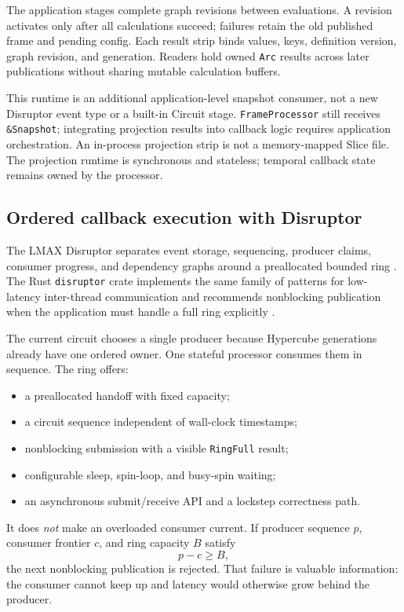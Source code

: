 \documentclass{strategynet-journal}
\newcommand{\SLICE}{\textsf{Slice}}
\begin{document}
The application stages complete graph revisions between evaluations.  A revision
activates only after all calculations succeed; failures retain the old published
frame and pending config.  Each result strip binds values, keys, definition
version, graph revision, and generation.  Readers hold owned \texttt{Arc} results
across later publications without sharing mutable calculation buffers.

This runtime is an additional application-level snapshot consumer, not a new
Disruptor event type or a built-in Circuit stage.  \texttt{FrameProcessor} still
receives \texttt{\&Snapshot}; integrating projection results into callback logic
requires application orchestration.  An in-process projection strip is not a
memory-mapped \SLICE{} file.  The projection runtime is synchronous and stateless;
temporal callback state remains owned by the processor.

\subsection{Ordered callback execution with Disruptor}

The LMAX Disruptor separates event storage, sequencing, producer claims,
consumer progress, and dependency graphs around a preallocated bounded ring
\cite{lmax}.  The Rust \texttt{disruptor} crate implements the same family of
patterns for low-latency inter-thread communication and recommends
nonblocking publication when the application must handle a full ring
explicitly \cite{rustdisruptor}.

The current circuit chooses a single producer because Hypercube generations
already have one ordered owner.  One stateful processor consumes them in
sequence.  The ring offers:
\begin{itemize}
  \item a preallocated handoff with fixed capacity;
  \item a circuit sequence independent of wall-clock timestamps;
  \item nonblocking submission with a visible \texttt{RingFull} result;
  \item configurable sleep, spin-loop, and busy-spin waiting;
  \item an asynchronous submit/receive API and a lockstep correctness path.
\end{itemize}

It does \emph{not} make an overloaded consumer current.  If producer sequence
\(p\), consumer frontier \(c\), and ring capacity \(B\) satisfy
\[
  p-c\ge B,
\]
the next nonblocking publication is rejected.  That failure is valuable
information: the consumer cannot keep up and latency would otherwise grow
behind the producer.
\end{document}
